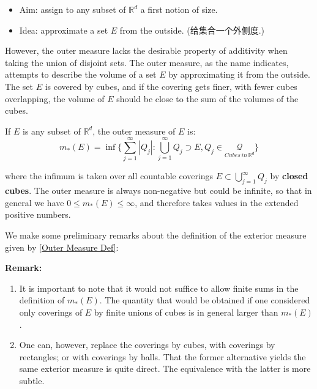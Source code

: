 \documentclass[UTF8,12pt,AutoFakeBold]{ctexbook}
\numberwithin{equation}{section}
\begin{document}
	\begin{mybox1}
		\begin{itemize}
			\item Aim: assign to any subset of  $\mathbb{R}^d$ a first notion of size.
			\item Idea: approximate a set $E$ from the outside. (给集合一个外侧度.)
		\end{itemize}
	\end{mybox1}
	 However, the outer measure lacks the desirable property of additivity when taking the union of disjoint sets. The outer measure, as the name indicates, attempts to describe the volume of a set $E$ by approximating it from the outside. The set $E$ is covered by cubes, and if the covering gets finer, with fewer cubes overlapping, the volume of $E$ should be close to the sum of the volumes of the cubes.
	\begin{definition}
		If $E$ is any subset of $\mathbb{R}^d$, the outer measure of $E$ is:
		\begin{equation}\label{Outer Measure Def}
			m_{\ast }(E) = \inf\{\sum_{j=1}^{\infty}|Q_j|: \bigcup_{j=1}^{\infty}Q_j \supset E,Q_j\in\underset{Cubes\, in\, \mathbb{R}^d}{\mathcal{Q}}\}
		\end{equation}
	\end{definition}
	where the infimum is taken over all countable coverings $E \subset \bigcup_{j=1}^{\infty} Q_j$ by \textbf{closed cubes}. The outer measure is always non-negative but could be infinite, so that in general we have $0 \leq m_*(E) \leq \infty$, and therefore takes values in the extended positive numbers.
	
	We make some preliminary remarks about the definition of the exterior measure given by \eqref{Outer Measure Def}:

	\textbf{Remark:}
	\begin{enumerate}
		\item  It is important to note that it would not suffice to allow finite sums in the definition of $m_*(E)$. The quantity that would be obtained if one considered only coverings of $E$ by finite unions of cubes is in general larger than $m_*(E)$.
		\item One can, however, replace the coverings by cubes, with coverings by rectangles; or with coverings by balls. That the former alternative yields the same exterior measure is quite direct. The equivalence with the latter is more subtle.
	\end{enumerate}
	
	
\end{document}
